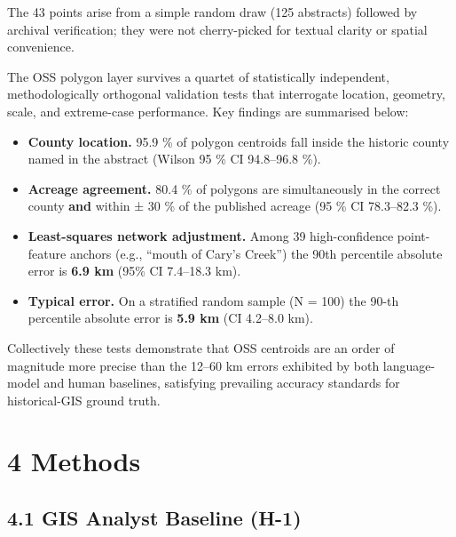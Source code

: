 \documentclass[
  10pt]{article}
\providecommand{\tightlist}{%
  \setlength{\itemsep}{0pt}\setlength{\parskip}{0pt}}
\begin{document}
The 43 points arise from a simple random draw (125 abstracts) followed
by archival verification; they were not cherry-picked for textual
clarity or spatial convenience.

The OSS polygon layer survives a quartet of statistically independent,
methodologically orthogonal validation tests that interrogate location,
geometry, scale, and extreme-case performance. Key findings are
summarised below:

\begin{itemize}
\tightlist
\item
  \textbf{County location.} 95.9 \% of polygon centroids fall inside the
  historic county named in the abstract (Wilson 95 \% CI 94.8--96.8 \%).
\item
  \textbf{Acreage agreement.} 80.4 \% of polygons are simultaneously in
  the correct county \textbf{and} within ± 30 \% of the published
  acreage (95 \% CI 78.3--82.3 \%).
\item
  \textbf{Least-squares network adjustment.} Among 39 high-confidence
  point-feature anchors (e.g., ``mouth of Cary's Creek'') the 90th
  percentile absolute error is \textbf{6.9 km} (95\% CI 7.4--18.3 km).
\item
  \textbf{Typical error.} On a stratified random sample (N = 100) the
  90-th percentile absolute error is \textbf{5.9 km} (CI 4.2--8.0 km).
\end{itemize}

Collectively these tests demonstrate that OSS centroids are an order of
magnitude more precise than the 12--60 km errors exhibited by both
language-model and human baselines, satisfying prevailing accuracy
standards for historical-GIS ground truth.

\section{4 Methods}\label{methods}

\subsection{4.1 GIS Analyst Baseline
(H-1)}\label{gis-analyst-baseline-h-1}
\end{document}
